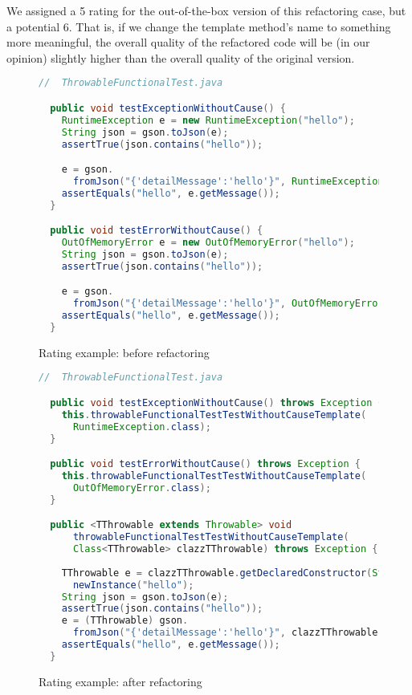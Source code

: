 We assigned a 5 rating for the out-of-the-box version of this refactoring case, but a potential 6. That is, if we change the template method's name to something more meaningful, the overall quality of the refactored code will be (in our opinion) slightly higher than the overall quality of the original version.

\begin{figure}
\begin{lstlisting}[language=Java]
  //  ThrowableFunctionalTest.java

  public void testExceptionWithoutCause() {
    RuntimeException e = new RuntimeException("hello");
    String json = gson.toJson(e);
    assertTrue(json.contains("hello"));

    e = gson.
      fromJson("{'detailMessage':'hello'}", RuntimeException.class);
    assertEquals("hello", e.getMessage());
  }

  public void testErrorWithoutCause() {
    OutOfMemoryError e = new OutOfMemoryError("hello");
    String json = gson.toJson(e);
    assertTrue(json.contains("hello"));

    e = gson.
      fromJson("{'detailMessage':'hello'}", OutOfMemoryError.class);
    assertEquals("hello", e.getMessage());
  }
\end{lstlisting}
\caption{Rating example: before refactoring}
\label{figure:rating-before}
\end{figure}

\begin{figure}
\begin{lstlisting}[language=Java]
  //  ThrowableFunctionalTest.java

  public void testExceptionWithoutCause() throws Exception {
    this.throwableFunctionalTestTestWithoutCauseTemplate(
      RuntimeException.class);
  }

  public void testErrorWithoutCause() throws Exception {
    this.throwableFunctionalTestTestWithoutCauseTemplate(
      OutOfMemoryError.class);
  }

  public <TThrowable extends Throwable> void
      throwableFunctionalTestTestWithoutCauseTemplate(
      Class<TThrowable> clazzTThrowable) throws Exception {
      
    TThrowable e = clazzTThrowable.getDeclaredConstructor(String.class).
      newInstance("hello");
    String json = gson.toJson(e);
    assertTrue(json.contains("hello"));
    e = (TThrowable) gson.
      fromJson("{'detailMessage':'hello'}", clazzTThrowable);
    assertEquals("hello", e.getMessage());
  }
\end{lstlisting}
\caption{Rating example: after refactoring}
\label{figure:rating-after}
\end{figure}


